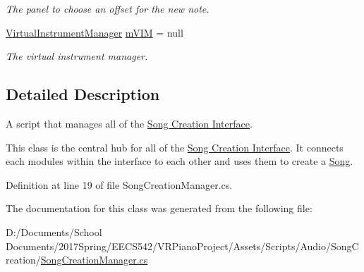 \begin{DoxyCompactItemize}
\begin{DoxyCompactList}\small\item\em The panel to choose an offset for the new note. \end{DoxyCompactList}\item 
\hyperlink{class_virtual_instrument_manager}{Virtual\+Instrument\+Manager} \hyperlink{group___s_c_m_priv_var_ga7822ac42d20a4577db66808f000decfb}{m\+V\+IM} = null
\begin{DoxyCompactList}\small\item\em The virtual instrument manager. \end{DoxyCompactList}\end{DoxyCompactItemize}


\subsection{Detailed Description}
A script that manages all of the \hyperlink{group___doc_s_c}{Song Creation Interface}. 

This class is the central hub for all of the \hyperlink{group___doc_s_c}{Song Creation Interface}. It connects each modules within the interface to each other and uses them to create a \hyperlink{class_song}{Song}. 

Definition at line 19 of file Song\+Creation\+Manager.\+cs.



The documentation for this class was generated from the following file\+:\begin{DoxyCompactItemize}
\item 
D\+:/\+Documents/\+School Documents/2017\+Spring/\+E\+E\+C\+S542/\+V\+R\+Piano\+Project/\+Assets/\+Scripts/\+Audio/\+Song\+Creation/\hyperlink{_song_creation_manager_8cs}{Song\+Creation\+Manager.\+cs}\end{DoxyCompactItemize}
